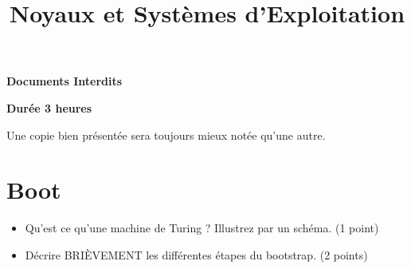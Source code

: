 %
%
%
%
%
%

%
%

%
%

\def\path{../../..}

%
%



%
%

\title{Noyaux et Syst\`emes d'Exploitation}

%
%

\rhead{}

%
%



%
%

\maketitle

%
%

\indentation{}

%
%

\begin{center}

\textbf{Documents Interdits}

\textbf{Dur\'ee 3 heures}

\scriptsize{Une copie bien pr\'esent\'ee sera toujours mieux not\'ee
            qu'une autre.}

\end{center}

%
%

%
%

\section{{Boot}
         {\hfill{} }}

\begin{itemize}
  \item Qu'est ce qu'une machine de Turing ? Illustrez par un sch\'ema. (1 point)
  \item D\'ecrire BRI\`EVEMENT les diff\'erentes \'etapes du bootstrap. (2 points)
\end{itemize}

